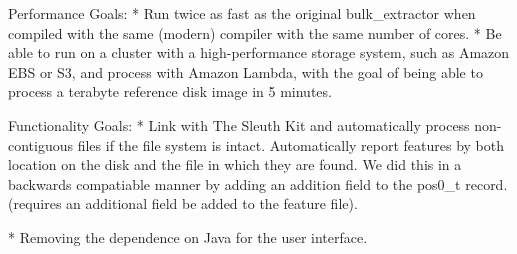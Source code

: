 Performance Goals:
* Run twice as fast as the original bulk_extractor when compiled with
the same (modern) compiler with the same number of cores.
* Be able to run on a cluster with a high-performance storage system,
such as Amazon EBS or S3, and process with Amazon Lambda, with the
goal of being able to process a terabyte reference disk image in 5
minutes.

Functionality Goals:
* Link with The Sleuth Kit and automatically process non-contiguous
files if the file system is intact. Automatically report features by
both location on the disk and the file in which they are found. We did
this in a backwards compatiable manner by adding an addition field to
the pos0_t record.
(requires an additional field be added to the feature file).

* Removing the dependence on Java for the user interface.

